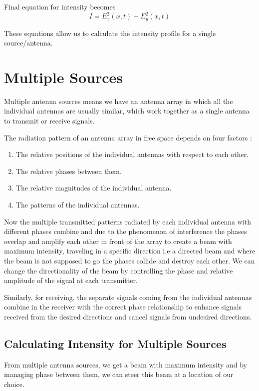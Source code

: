 Final equation for intensity becomes
%
\begin{equation}\label{eqn:final_intensity}
   I = E_x^2(x,t)+E_y^2(x,t)
\end{equation}

These equations allow us to calculate the intensity profile for a single source/antenna.


\section{Multiple Sources}

Multiple antenna sources means we have an antenna array in which all the individual antennas are usually similar, which work together as a single antenna to transmit or receive signals.

The radiation pattern of an antenna array in free space depends on four factors \cite{mailloux2005phased}:
%
\begin{enumerate}
	\item The relative positions of the individual antennas with respect to each other.
	\item The relative phases between them.
	\item The relative magnitudes of the individual antenna.
	\item The patterns of the individual antennas.
\end{enumerate}

	
Now the multiple transmitted patterns radiated by each individual antenna with different phases combine and due to the phenomenon of interference the phases overlap and amplify each other in front of the array to create a beam with maximum intensity, traveling in a specific direction i.e a directed beam and where the beam is not supposed to go the phases collide and destroy each other. We can change the directionality of the beam by controlling the phase and relative amplitude of the signal at each transmitter.

Similarly, for receiving, the separate signals coming from the individual antennas combine in the receiver with the correct phase relationship to enhance signals received from the desired directions and cancel signals from undesired directions.

\subsection{Calculating Intensity for Multiple Sources}

From multiple antenna sources, we get a beam with maximum intensity and by managing phase between them, we can steer this beam at a location of our choice.


